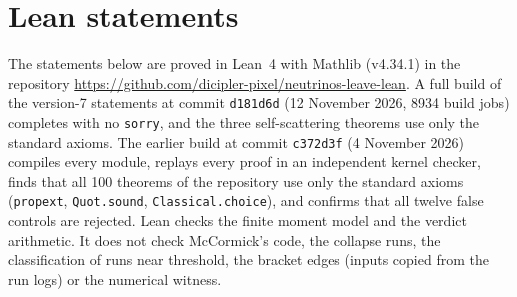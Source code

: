 \documentclass[11pt]{article}
\begin{document}
\section{Lean statements}
\sloppy
The statements below are proved in Lean~4 with Mathlib (v4.34.1) in the repository \url{https://github.com/dicipler-pixel/neutrinos-leave-lean}. A full build of the version-7 statements at commit \texttt{d181d6d} (12 November 2026, 8934 build jobs) completes with no \texttt{sorry}, and the three self-scattering theorems use only the standard axioms. The earlier build at commit \texttt{c372d3f} (4 November 2026) compiles every module, replays every proof in an independent kernel checker, finds that all 100 theorems of the repository use only the standard axioms (\texttt{propext}, \texttt{Quot.sound}, \texttt{Classical.choice}), and confirms that all twelve false controls are rejected. Lean checks the finite moment model and the verdict arithmetic. It does not check McCormick's code, the collapse runs, the classification of runs near threshold, the bracket edges (inputs copied from the run logs) or the numerical witness.
\end{document}
